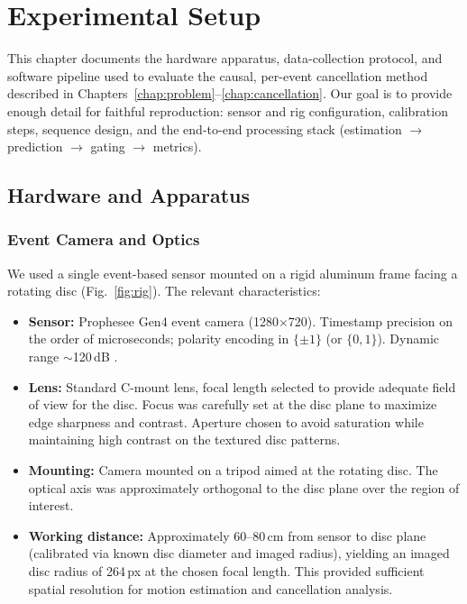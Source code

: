 \chapter{Experimental Setup}
\label{chap:setup}

This chapter documents the hardware apparatus, data-collection protocol, and software pipeline used to evaluate the causal, per-event cancellation method described in Chapters~\ref{chap:problem}--\ref{chap:cancellation}. Our goal is to provide enough detail for faithful reproduction: sensor and rig configuration, calibration steps, sequence design, and the end-to-end processing stack (estimation $\rightarrow$ prediction $\rightarrow$ gating $\rightarrow$ metrics).

\section{Hardware and Apparatus}
\label{sec:hardware}

\subsection{Event Camera and Optics}
We used a single event-based sensor mounted on a rigid aluminum frame facing a rotating disc (Fig.~\ref{fig:rig}). The relevant characteristics:

\begin{itemize}
  \item \textbf{Sensor:} Prophesee Gen4 event camera (1280$\times$720). Timestamp precision on the order of microseconds; polarity encoding in $\{\pm1\}$ (or $\{0,1\}$). Dynamic range $\sim$120\,dB \cite{Finateu2020ISSCC}.
  \item \textbf{Lens:} Standard C-mount lens, focal length selected to provide adequate field of view for the disc. Focus was carefully set at the disc plane to maximize edge sharpness and contrast. Aperture chosen to avoid saturation while maintaining high contrast on the textured disc patterns.
  \item \textbf{Mounting:} Camera mounted on a tripod aimed at the rotating disc. The optical axis was approximately orthogonal to the disc plane over the region of interest.
  \item \textbf{Working distance:} Approximately 60--80\,cm from sensor to disc plane (calibrated via known disc diameter and imaged radius), yielding an imaged disc radius of 264\,px at the chosen focal length. This provided sufficient spatial resolution for motion estimation and cancellation analysis.
\end{itemize}

